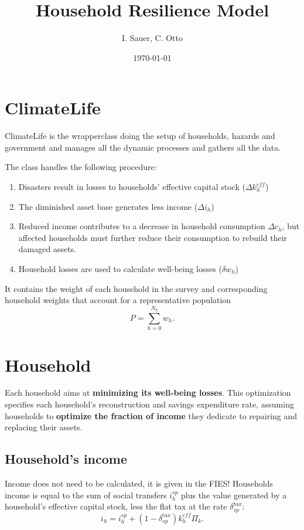 \documentclass{article}
\author{I. Sauer, C. Otto}
\title{Household Resilience Model }
\date{\today}
\begin{document}
\maketitle
\section{ClimateLife}
ClimateLife is the wrapperclass doing the setup of households, hazards and government and manages all the dynamic processes and gathers all the data.

The class handles the following procedure:
\begin{enumerate}
\item Disasters result in losses to households' effective capital stock ($\Delta k_{h}^{eff}$)
\item The diminished asset base generates less income ($\Delta i_{h}$)
\item Reduced income contributes to a decrease in household consumption $\Delta c_{h}$, but affected households must further reduce their consumption to rebuild their damaged assets.
\item Household losses are used to calculate well-being losses ($\delta w_{h}$)
\end{enumerate}

It contains  the weight of each household in the survey and corresponding household weights that account for a representative population
\begin{equation}
  \label{eq:P}
P = \sum_{h=0}^{N_h} w_h.
\end{equation}

\section{Household}
Each household aims at \textbf{minimizing its well-being losses}. This optimization specifies each household's reconstruction and savings expenditure rate, assuming households to \textbf{optimize the fraction of income} they dedicate to repairing and replacing their assets.

\subsection{Household's income}
Income does not need to be calculated, it is given in the FIES!
Households income is equal to the sum of social transfers $i_h^{sp}$ plus the value generated by a household's effective capital stock, less the flat tax at the rate $\delta_{sp}^{tax}$:
\begin{equation}
  \label{eq:ih}
  i_h = i_h^{sp}+(1-\delta_{sp}^{tax}) k_h^{eff} \Pi_k.
\end{equation}
\end{document}
